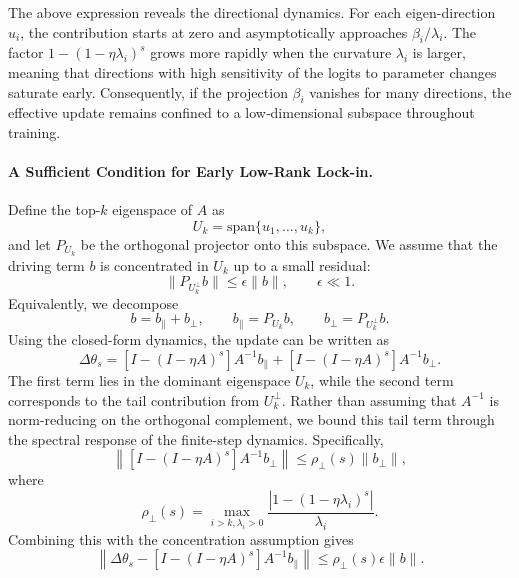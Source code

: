 \documentclass{llmxive}
\begin{document}
The above expression reveals the directional dynamics. For each eigen-direction \(u_i\), the contribution starts at zero and asymptotically approaches \(\beta_i/\lambda_i\). The factor \(1-(1-\eta\lambda_i)^s\) grows more rapidly when the curvature \(\lambda_i\) is larger, meaning that directions with high sensitivity of the logits to parameter changes saturate early. Consequently, if the projection \(\beta_i\) vanishes for many directions, the effective update remains confined to a low‑dimensional subspace throughout training.

\paragraph{A Sufficient Condition for Early Low-Rank Lock-in.}
Define the top-\(k\) eigenspace of \(A\) as
\[
U_k=\mathrm{span}\{u_1,\dots,u_k\},
\]
and let \(P_{U_k}\) be the orthogonal projector onto this subspace. We assume that the driving term \(b\) is concentrated in \(U_k\) up to a small residual:
\begin{equation}
\|P_{U_k^\perp}b\|\leq \epsilon\|b\|,
\qquad
\epsilon\ll 1.
\end{equation}
Equivalently, we decompose
\[
b=b_{\parallel}+b_{\perp},
\qquad
b_{\parallel}=P_{U_k}b,
\qquad
b_{\perp}=P_{U_k^\perp}b .
\]
Using the closed-form dynamics, the update can be written as
\begin{equation}
\Delta\theta_s
=
[I-(I-\eta A)^s]A^{-1}b_{\parallel}
+
[I-(I-\eta A)^s]A^{-1}b_{\perp}.
\end{equation}
The first term lies in the dominant eigenspace \(U_k\), while the second term corresponds to the tail contribution from \(U_k^\perp\). Rather than assuming that \(A^{-1}\) is norm-reducing on the orthogonal complement, we bound this tail term through the spectral response of the finite-step dynamics. Specifically,
\begin{equation}
\left\|
[I-(I-\eta A)^s]A^{-1}b_{\perp}
\right\|
\leq
\rho_{\perp}(s)\|b_{\perp}\|,
\end{equation}
where
\begin{equation}
\rho_{\perp}(s)
=
\max_{i>k,\lambda_i>0}
\frac{\left|1-(1-\eta\lambda_i)^s\right|}{\lambda_i}.
\end{equation}
Combining this with the concentration assumption gives
\begin{equation}
\left\|
\Delta\theta_s
-
[I-(I-\eta A)^s]A^{-1}b_{\parallel}
\right\|
\leq
\rho_{\perp}(s)\epsilon\|b\|.
\end{equation}
\end{document}
